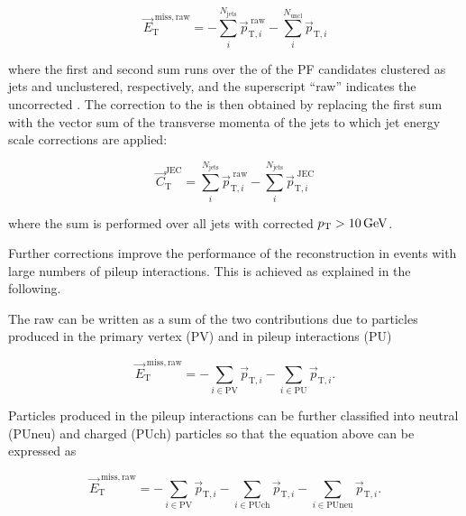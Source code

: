 \begin{equation}
{\vec E}_\mathrm{T}^\mathrm{\; miss,raw} = - \sum_{i}^{N_\mathrm{jets}} {\vec p}_{\mathrm{T},i}^{\;\mathrm{raw}} - \sum_{i}^{N_\mathrm{uncl}} {\vec p}_{\mathrm{T},i}
\end{equation}

where the first and second sum runs over the \pt of the PF candidates clustered as jets and unclustered, respectively, and the superscript ``raw'' indicates the uncorrected \pt.
The correction to the \VEtmiss is then obtained by replacing the first sum with the vector sum of the transverse momenta of the jets to which jet energy scale corrections are applied:

\begin{equation}
{\vec C}_\mathrm{T}^\mathrm{JEC} = \sum_{i}^{N_\mathrm{jets}} {\vec p}_{\mathrm{T},i}^{\;\mathrm{raw}} - \sum_{i}^{N_\mathrm{jets}} {\vec p}_{\mathrm{T},i}^{\;\mathrm{JEC}}
\end{equation}

where the sum is performed over all jets with corrected $p_{\mathrm{T}} > 10\,\text{Ge\hspace{-.08em}V}$.

Further corrections improve the performance of the \VEtmiss reconstruction in events with large numbers of pileup interactions. This is achieved as explained in the following.

The raw \VEtmiss can be written as a sum of the two contributions due to particles produced in the primary vertex (PV) and in pileup interactions (PU)

\begin{equation}\label{eqn:metraw}
{\vec E}_\mathrm{T}^\mathrm{\; miss,raw} = - \sum_{i \in \mathrm{PV}} {\vec p}_{\mathrm{T},i} - \sum_{i \in \mathrm{PU}} {\vec p}_{\mathrm{T},i}.
\end{equation}

Particles produced in the pileup interactions can be further classified into neutral (PUneu) and charged (PUch) particles so that the equation above can be expressed as

\begin{equation}
{\vec E}_\mathrm{T}^\mathrm{\; miss,raw} = - \sum_{i \in \mathrm{PV}} {\vec p}_{\mathrm{T},i} - \sum_{i \in \mathrm{PUch}} {\vec p}_{\mathrm{T},i} - \sum_{i \in \mathrm{PUneu}} {\vec p}_{\mathrm{T},i}.
\end{equation}

